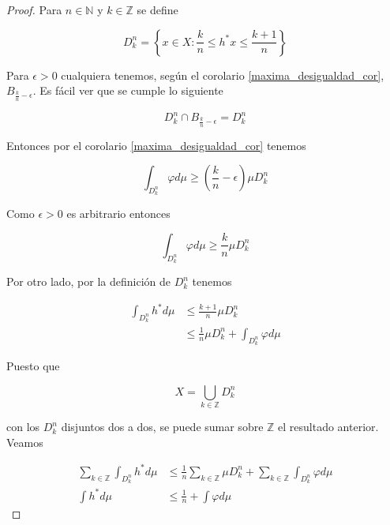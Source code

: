 \begin{proof}
	Para $n \in \mathbb{N}$ y $k \in \mathbb{Z}$ se define
	
	\begin{equation}
		D^n_k = \left\{ x \in X: \frac{k}{n} \leq h^* x \leq \frac{k+1}{n} \right\}
	\end{equation}
	
	Para $\epsilon > 0$ cualquiera tenemos, según el corolario \ref{maxima_desigualdad_cor}, $B_{\frac{k}{n}-\epsilon}$. Es fácil ver que se cumple lo siguiente
	
	\begin{equation}
		D^n_k \cap B_{\frac{k}{n}-\epsilon} = D^n_k
	\end{equation}
	
	Entonces por el corolario \ref{maxima_desigualdad_cor} tenemos
	
	\begin{equation}
		\int_{D^n_k} \varphi d\mu \geq \left( \frac{k}{n} - \epsilon \right) \mu D^n_k
	\end{equation}
	
	Como $\epsilon > 0$ es arbitrario entonces
	
	\begin{equation}
		\int_{D^n_k} \varphi d\mu \geq  \frac{k}{n}  \mu D^n_k	
	\end{equation}
	
	
	Por otro lado, por la definición de $D^n_k$ tenemos
	
	\begin{align}
		\int_{D^n_k} h^* d\mu &\leq \frac{k+1}{n} \mu D^n_k\\
		& \leq \frac{1}{n} \mu D^n_k + \int_{D^n_k} \varphi d\mu
	\end{align}
	
	Puesto que
	
	\begin{equation}
		X = \bigcup_{k \in \mathbb{Z}} D^n_k
	\end{equation}
	
	con los $D^n_k$ disjuntos dos a dos, se puede sumar sobre $\mathbb{Z}$ el resultado anterior. Veamos
	
	\begin{align}
		\sum_{k \in \mathbb{Z}} \int_{D^n_k} h^* d\mu &\leq \frac{1}{n} \sum_{k \in \mathbb{Z}} \mu D^n_k + \sum_{k \in \mathbb{Z}} \int_{D^n_k} \varphi d\mu\\
		\int h^* d\mu &\leq \frac{1}{n} + \int \varphi d\mu
	\end{align}
	

\end{proof}
